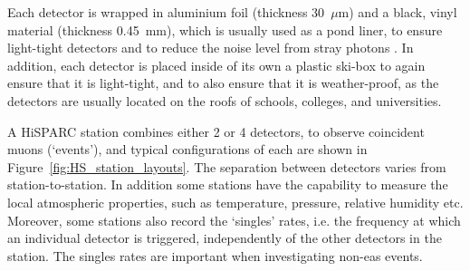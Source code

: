 Each detector is wrapped in aluminium foil (thickness 30~$\mu$m) and a black, vinyl material (thickness 0.45~mm), which is usually used as a pond liner, to ensure light-tight detectors and to reduce the noise level from stray photons \citep{van_dam_hisparc_2020}. In addition, each detector is placed inside of its own a plastic ski-box to again ensure that it is light-tight, and to also ensure that it is weather-proof, as the detectors are usually located on the roofs of schools, colleges, and universities.

A HiSPARC station combines either 2 or 4 detectors, to observe coincident muons (`events'), and typical configurations of each are shown in Figure~\ref{fig:HS_station_layouts}. The separation between detectors varies from station-to-station. In addition some stations have the capability to measure the local atmospheric properties, such as temperature, pressure, relative humidity etc. Moreover, some stations also record the `singles' rates, i.e. the frequency at which an individual detector is triggered, independently of the other detectors in the station. The singles rates are important when investigating non-\gls{eas} events.


